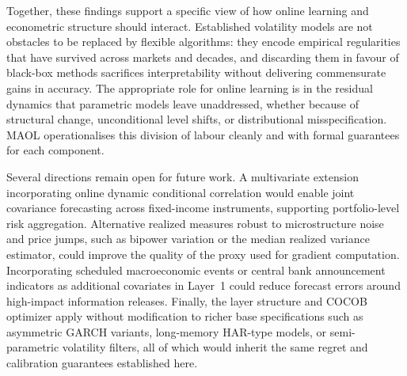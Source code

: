 Together, these findings support a specific view of how online learning and econometric structure should interact. Established volatility models are not obstacles to be replaced by flexible algorithms: they encode empirical regularities that have survived across markets and decades, and discarding them in favour of black-box methods sacrifices interpretability without delivering commensurate gains in accuracy. The appropriate role for online learning is in the residual dynamics that parametric models leave unaddressed, whether because of structural change, unconditional level shifts, or distributional misspecification. MAOL operationalises this division of labour cleanly and with formal guarantees for each component.

Several directions remain open for future work. A multivariate extension incorporating online dynamic conditional correlation would enable joint covariance forecasting across fixed-income instruments, supporting portfolio-level risk aggregation. Alternative realized measures robust to microstructure noise and price jumps, such as bipower variation \citep{barndorff2004power} or the median realized variance estimator, could improve the quality of the proxy used for gradient computation. Incorporating scheduled macroeconomic events or central bank announcement indicators as additional covariates in Layer~1 could reduce forecast errors around high-impact information releases. Finally, the layer structure and COCOB optimizer apply without modification to richer base specifications such as asymmetric GARCH variants, long-memory HAR-type models, or semi-parametric volatility filters, all of which would inherit the same regret and calibration guarantees established here.
